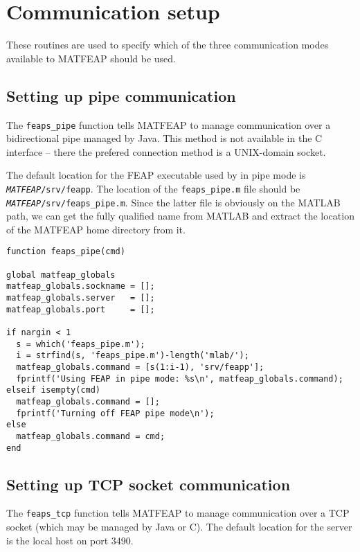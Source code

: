 \section {Communication setup}

These routines are used to specify which of the three communication modes
available to MATFEAP should be used.

\subsection{Setting up pipe communication}

The {\tt feaps\_pipe} function tells MATFEAP to manage communication
over a bidirectional pipe managed by Java.  This method is not
available in the C interface -- there the prefered connection method is
a UNIX-domain socket.

The default location for the FEAP executable used by in pipe mode is
{\tt {\it MATFEAP}/srv/feapp}.  The location of the {\tt feaps\_pipe.m}
file should be {\tt {\it MATFEAP}/srv/feaps\_pipe.m}.  Since the latter
file is obviously on the MATLAB path, we can get the fully qualified
name from MATLAB and extract the location of the MATFEAP home directory
from it.

\begin{verbatim}
function feaps_pipe(cmd)

global matfeap_globals
matfeap_globals.sockname = [];
matfeap_globals.server   = [];
matfeap_globals.port     = [];

if nargin < 1
  s = which('feaps_pipe.m');
  i = strfind(s, 'feaps_pipe.m')-length('mlab/');
  matfeap_globals.command = [s(1:i-1), 'srv/feapp'];
  fprintf('Using FEAP in pipe mode: %s\n', matfeap_globals.command);
elseif isempty(cmd)
  matfeap_globals.command = [];
  fprintf('Turning off FEAP pipe mode\n');
else
  matfeap_globals.command = cmd;
end

\end{verbatim}
\subsection{Setting up TCP socket communication}

The {\tt feaps\_tcp} function tells MATFEAP to manage communication
over a TCP socket (which may be managed by Java or C).  The default
location for the server is the local host on port 3490.

